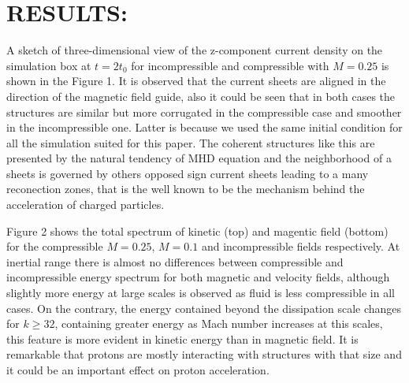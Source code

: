 \documentclass[%
aip,pop,amsmath,amssymb,
 reprint,%
]{revtex4-1}
\begin{document}
\section{\label{sec:level3}RESULTS:}

A sketch of three-dimensional view of the z-component current density on the simulation box at
$t=2t_0$ for incompressible and compressible with $M=0.25$ is shown in the Figure 1. It is 
observed that the current sheets are aligned in the direction of the magnetic field guide, also 
it could be seen that in both cases the structures are similar but more corrugated in the 
compressible case and smoother in the incompressible one. Latter is because we used the same 
initial condition for all the simulation suited for this paper. The coherent structures like
this are presented by the natural tendency of MHD equation and the neighborhood of a sheets
is governed by others opposed sign current sheets leading to a many reconection zones, that 
is the well known to be the mechanism behind the acceleration of charged particles.

Figure 2 shows the total spectrum of kinetic (top) and magentic field (bottom) for the 
compressible $M=0.25$, $M=0.1$ and incompressible fields respectively. At inertial range
there is almost no differences between compressible and incompressible energy spectrum for 
both magnetic and velocity fields, although slightly more energy at large scales is observed
as fluid is less compressible in all cases. On the contrary, the energy contained beyond the dissipation scale 
changes for $k\geq32$, containing greater energy as Mach number increases at this scales, 
this feature is more evident in kinetic energy than in magnetic field. It is remarkable 
that protons are mostly interacting with structures with that size and it could be an 
important effect on proton acceleration.
\end{document}
